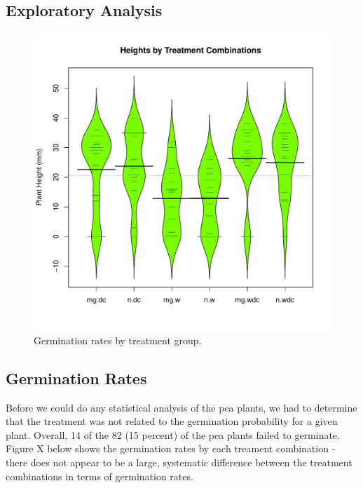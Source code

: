 \documentclass[preprint,12pt]{elsarticle}\usepackage[]{graphicx}\usepackage[]{color}
\makeatletter
\def\maxwidth{ %
  \ifdim\Gin@nat@width>\linewidth
    \linewidth
  \else
    \Gin@nat@width
  \fi
}
\newenvironment{knitrout}{}{} %
\makeatother
\begin{document}
\subsection{Exploratory Analysis}
\begin{knitrout}
\color{fgcolor}\begin{figure}
\includegraphics[width=\maxwidth]{figure/eda-1} \caption[Germination rates by treatment group]{Germination rates by treatment group.}\label{fig:eda}
\end{figure}


\end{knitrout}




\subsection{Germination Rates}
Before we could do any statistical analysis of the pea plants, we had to determine that the treatment was not related to the germination probability for a given plant. Overall, 14 of the 82 (15 percent) of the pea plants failed to germinate. Figure X below shows the germination rates by each treament combination - there does not appear to be a large, systematic difference between the treatment combinations in terms of germination rates. 
\end{document}
